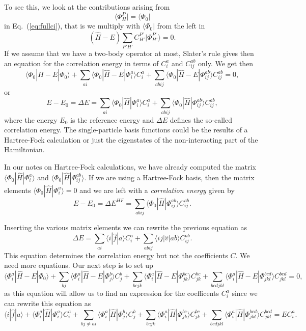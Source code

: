 To see this, we look at the contributions arising from 
\[
\langle \Phi_H^P | = \langle \Phi_0|
\]
in  Eq.~(\ref{eq:fullci}), that is we multiply with $\langle \Phi_0 |$
from the left in 
\[
(\hat{H} -E)\sum_{P'H'}C_{H'}^{P'}|\Phi_{H'}^{P'} \rangle=0. 
\]
If we assume that we have a two-body operator at most, Slater's rule gives then an equation for the 
correlation energy in terms of $C_i^a$ and $C_{ij}^{ab}$ only.  We get then
\[
\langle \Phi_0 | \hat{H} -E| \Phi_0\rangle + \sum_{ai}\langle \Phi_0 | \hat{H} -E|\Phi_{i}^{a} \rangle C_{i}^{a}+
\sum_{abij}\langle \Phi_0 | \hat{H} -E|\Phi_{ij}^{ab} \rangle C_{ij}^{ab}=0,
\]
or 
\[
E-E_0 =\Delta E=\sum_{ai}\langle \Phi_0 | \hat{H}|\Phi_{i}^{a} \rangle C_{i}^{a}+
\sum_{abij}\langle \Phi_0 | \hat{H}|\Phi_{ij}^{ab} \rangle C_{ij}^{ab},
\]
where the energy $E_0$ is the reference energy and $\Delta E$ defines the so-called correlation energy.
The single-particle basis functions  could be the results of a Hartree-Fock calculation or just the eigenstates of the non-interacting part of the Hamiltonian. 

In our notes on Hartree-Fock calculations, 
we have already computed the matrix $\langle \Phi_0 | \hat{H}|\Phi_{i}^{a}\rangle $ and $\langle \Phi_0 | \hat{H}|\Phi_{ij}^{ab}\rangle$.  If we are using a Hartree-Fock basis, then the matrix elements
$\langle \Phi_0 | \hat{H}|\Phi_{i}^{a}\rangle=0$ and we are left with a \emph{correlation energy} given by
\[
E-E_0 =\Delta E^{HF}=\sum_{abij}\langle \Phi_0 | \hat{H}|\Phi_{ij}^{ab} \rangle C_{ij}^{ab}. 
\]


Inserting the various matrix elements we can rewrite the previous equation as
\[
\Delta E=\sum_{ai}\langle i| \hat{f}|a \rangle C_{i}^{a}+
\sum_{abij}\langle ij | \hat{v}| ab \rangle C_{ij}^{ab}.
\]
This equation determines the correlation energy but not the coefficients $C$. 
We need more equations. Our next step is to set up
\[
\langle \Phi_i^a | \hat{H} -E| \Phi_0\rangle + \sum_{bj}\langle \Phi_i^a | \hat{H} -E|\Phi_{j}^{b} \rangle C_{j}^{b}+
\sum_{bcjk}\langle \Phi_i^a | \hat{H} -E|\Phi_{jk}^{bc} \rangle C_{jk}^{bc}+
\sum_{bcdjkl}\langle \Phi_i^a | \hat{H} -E|\Phi_{jkl}^{bcd} \rangle C_{jkl}^{bcd}=0,
\]
as this equation will allow us to find an expression for the coefficents $C_i^a$ since we can rewrite this equation as 
\[
\langle i | \hat{f}| a\rangle +\langle \Phi_i^a | \hat{H}|\Phi_{i}^{a} \rangle C_{i}^{a}+ \sum_{bj\ne ai}\langle \Phi_i^a | \hat{H}|\Phi_{j}^{b} \rangle C_{j}^{b}+
\sum_{bcjk}\langle \Phi_i^a | \hat{H}|\Phi_{jk}^{bc} \rangle C_{jk}^{bc}+
\sum_{bcdjkl}\langle \Phi_i^a | \hat{H}|\Phi_{jkl}^{bcd} \rangle C_{jkl}^{bcd}=EC_i^a.
\]

